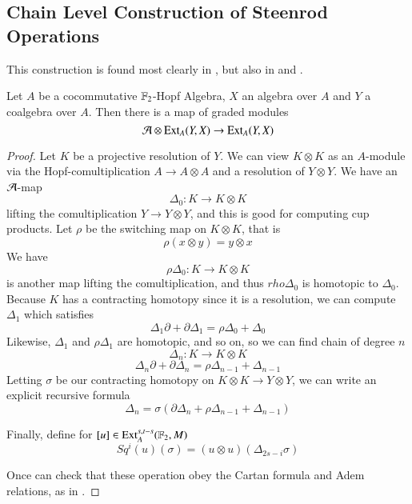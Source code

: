 \subsection{Chain Level Construction of Steenrod Operations}
\label{sec:SteenrodConstruction}

This construction is found most clearly in \cite{kahnCupi}, but also in \cite{milgramGroupReps} and \cite{H00RingSpectra}.  

\begin{Theorem}
  Let $A$ be a cocommutative $\mathbb{F}_2$-Hopf Algebra, $X$ an algebra over $A$ and $Y$ a coalgebra over $A$.  
  Then there is a map of graded modules
  \[\mathcal{A}\otimes \operatorname{Ext}\nolimits_A(Y,X)\to \operatorname{Ext}\nolimits_A(Y,X)\]
\end{Theorem}

\begin{proof}
  Let $K$ be a projective resolution of $Y$.
  We can view $K\otimes K$ as an $A$-module via the Hopf-comultiplication $A\to A\otimes A$ and a resolution of $Y\otimes Y$.  
  We have an $\mathcal{A}$-map 
  \[\Delta_0:K\to K\otimes K\]
  lifting the comultiplication $Y\to Y\otimes Y$, and this is good for computing cup products. 
  Let $\rho$ be the switching map on $K\otimes K$, that is
  \[\rho (x\otimes y) = y\otimes x\]
  We have
  \[\rho\Delta_0 : K\to K\otimes K\]
  is another map lifting the comultiplication, and thus $rho\Delta_0$ is homotopic to $\Delta_0$.  
  Because $K$ has a contracting homotopy since it is a resolution, we can compute $\Delta_1$ which satisfies
  \[\Delta_1\partial + \partial\Delta_1 = \rho\Delta_0+\Delta_0\]
  Likewise, $\Delta_1$ and $\rho\Delta_1$ are homotopic, and so on, so we can find chain of degree $n$
  \[\Delta_n :K\to K\otimes K\]
  \[\Delta_n\partial + \partial\Delta_n = \rho\Delta_{n-1}+\Delta_{n-1}\]
  Letting $\sigma$ be our contracting homotopy on $K\otimes K\to Y\otimes Y$, we can write an explicit recursive formula
  \[\Delta_n = \sigma(\partial\Delta_n + \rho\Delta_{n-1}+\Delta_{n-1})\]
  
  Finally, define for $[u]\in \operatorname{Ext}\nolimits_A^{s,t-s}(\mathbb{F}_2,M)$
  \[Sq^i(u)(\sigma) = (u\otimes u)(\Delta_{2s-i}\sigma)\]

  Once can check that these operation obey the Cartan formula and Adem relations, as in \cite{May_ageneral}.  
  
\end{proof}



